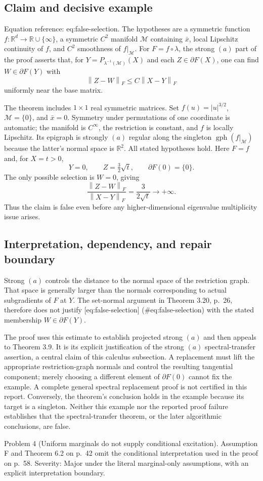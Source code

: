 \documentclass[10pt]{article}
\begin{document}
\subsection*{Claim and decisive example}
Equation reference: eq:false-selection. The hypotheses are a symmetric function \(f:\mathbb R^d\to\mathbb R\cup\{\infty\}\), a symmetric \(C^2\) manifold \(\mathcal M\) containing \(\bar x\), local Lipschitz continuity of \(f\), and \(C^2\) smoothness of \(f|_\mathcal M\). For \(F=f\circ\lambda\), the strong \((a)\) part of the proof asserts that, for \(Y=P_{\lambda^{-1}(\mathcal M)}(X)\) and each \(Z\in\partial F(X)\), one can find \(W\in\partial F(Y)\) with \[
 \left\|Z-W\right\|_F\le C\left\|X-Y\right\|_F\] uniformly near the base matrix.\par
The theorem includes \(1\times1\) real symmetric matrices. Set \(f(u)=|u|^{3/2}\), \(\mathcal M=\{0\}\), and \(\bar x=0\). Symmetry under permutations of one coordinate is automatic; the manifold is \(C^\infty\), the restriction is constant, and \(f\) is locally Lipschitz. Its epigraph is strongly \((a)\) regular along the singleton \(\mathop{\mathrm{gph}}(f|_\mathcal M)\) because the latter’s normal space is \(\mathbb R^2\). All stated hypotheses hold. Here \(F=f\) and, for \(X=t>0\), \[Y=0,\qquad Z=\tfrac32\sqrt t,\qquad \partial F(0)=\{0\}.\] The only possible selection is \(W=0\), giving \[\frac{\left\|Z-W\right\|_F}{\left\|X-Y\right\|_F}
 =\frac{3}{2\sqrt t}\longrightarrow+\infty.\] Thus the claim is false even before any higher-dimensional eigenvalue multiplicity issue arises.\par
\subsection*{Interpretation, dependency, and repair boundary}
Strong \((a)\) controls the distance to the normal space of the restriction graph. That space is generally larger than the normals corresponding to actual subgradients of \(F\) at \(Y\). The set-normal argument in Theorem 3.20, p. 26, therefore does not justify [eq:false-selection] (\#eq:false-selection) with the stated membership \(W\in\partial F(Y)\).\par
The proof uses this estimate to establish projected strong \((a)\) and then appeals to Theorem 3.9. It is its explicit justification of the strong \((a)\) spectral-transfer assertion, a central claim of this calculus subsection. A replacement must lift the appropriate restriction-graph normals and control the resulting tangential component; merely choosing a different element of \(\partial F(0)\) cannot fix the example. A complete general spectral replacement proof is not certified in this report. Conversely, the theorem’s conclusion holds in the example because its target is a singleton. Neither this example nor the reported proof failure establishes that the spectral-transfer theorem, or the later algorithmic conclusions, are false.\par
Problem 4 (Uniform marginals do not supply conditional excitation).  Assumption F and Theorem 6.2 on p. 42 omit the conditional interpretation used in the proof on p. 58. Severity: Major under the literal marginal-only assumptions, with an explicit interpretation boundary.\par
\end{document}
